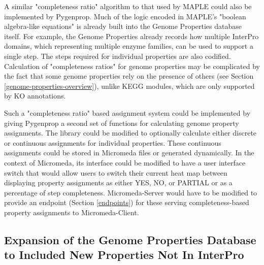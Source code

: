 A similar "completeness ratio" algorithm to that used by MAPLE could also be implemented by Pygenprop. Much of the logic encoded in MAPLE's "boolean algebra-like equations" is already built into the Genome Properties database itself. For example, the Genome Properties already records how multiple InterPro domains, which representing multiple enzyme families, can be used to support a single step. The steps required for individual properties are also codified. Calculation of "completeness ratios" for genome properties may be complicated by the fact that some genome properties rely on the presence of others (see Section \ref{genome-properties-overview}), unlike KEGG modules, which are only supported by KO annotations.

Such a "completeness ratio" based assignment system could be implemented by giving Pygenprop a second set of functions for calculating genome property assignments. The library could be modified to optionally calculate either discrete or continuous assignments for individual properties. These continuous assignments could be stored in Micromeda files or generated dynamically. In the context of Micromeda, its interface could be modified to have a user interface switch that would allow users to switch their current heat map between displaying property assignments as either YES, NO, or PARTIAL or as a percentage of step completeness. Micromeda-Server would have to be modified to provide an endpoint (Section \ref{endpoints}) for these serving completeness-based property assignments to Micromeda-Client.

\subsection{Expansion of the Genome Properties Database to Included New Properties Not In InterPro}

